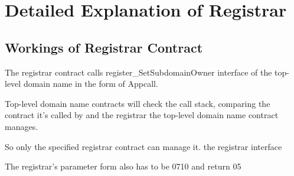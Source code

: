 \documentclass[letterpaper,10pt,english]{sphinxmanual}
\begin{document}
\section{Detailed Explanation of Registrar}
\label{\detokenize{nns_protocol:detailed-explanation-of-registrar}}

\subsection{Workings of Registrar Contract}
\label{\detokenize{nns_protocol:workings-of-registrar-contract}}
The registrar contract calls register\_SetSubdomainOwner interface of the top-level domain name in the form of Appcall.

%
\begin{sphinxVerbatim}[commandchars=\\\{\}]
\PYG{p}{[}\PYG{p}{]}
     \PYG{p}{[}\PYG{p}{]} 
\end{sphinxVerbatim}

Top-level domain name contracts will check the call stack, comparing the contract it’s called by and the registrar the top-level domain name contract manages.

So only the specified registrar contract can manage it.
the registrar interface

The registrar’s parameter form also has to be 0710 and return 05

%
\begin{sphinxVerbatim}[commandchars=\\\{\}]
     \PYG{p}{[}\PYG{p}{]} 
       
         \PYG{p}{[}\PYG{p}{]}\PYG{p}{[}\PYG{p}{]} \PYG{p}{[}\PYG{p}{]}
       
         \PYG{p}{[}\PYG{p}{]}\PYG{p}{[}\PYG{p}{]} \PYG{p}{[}\PYG{p}{]}\PYG{p}{[}\PYG{p}{]} \PYG{p}{[}\PYG{p}{]}
\end{sphinxVerbatim}
\end{document}
